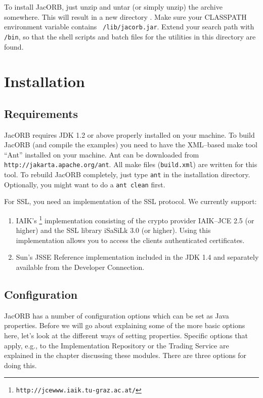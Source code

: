 \documentclass[12pt]{scrbook}
\begin{document}
To install JacORB, just unzip  and untar (or simply unzip) the archive
somewhere.  This will result  in a new directory {\tt \JacORBDir}.
Make   sure  your   CLASSPATH  environment   variable   contains  {\tt
\JacORBDir/lib/jacorb.jar}. Extend  your search path  with
{\tt  \JacORBDir/bin}, so  that the shell scripts and batch files  for
the utilities in this directory are found.

\section{Installation}
\label{Sec_installation}

\subsection{Requirements}

JacORB requires JDK 1.2 or above properly installed on your machine.
To build JacORB (and compile the examples) you need to have the
XML--based make tool ``Ant'' installed on your machine.  Ant can be
downloaded from {\tt http://jakarta.apache.org/ant}. All make files
({\tt build.xml}) are written for this tool. To rebuild JacORB
completely, just type {\tt ant} in the installation directory.
Optionally, you might want to do a {\tt ant clean} first.

For SSL, you need an implementation of the SSL protocol. We currently support:

\begin{enumerate}
\item IAIK's \footnote{{\tt http://jcewww.iaik.tu-graz.ac.at/}} implementation
  consisting of the crypto provider IAIK--JCE 2.5 (or higher) and the SSL
  library iSaSiLk 3.0 (or higher). Using this implementation allows you to
  access the clients authenticated certificates.
\item Sun's JSSE Reference implementation included in the JDK 1.4 and
  separately available from the Developer Connection.
\end{enumerate}

\subsection{Configuration}
\label{configuration}

JacORB has a number of configuration  options which can be set as Java
properties.  Before we will go about explaining some of the more basic
options   here,  let's  look   at  the   different  ways   of  setting
properties. Specific  options that apply, e.g.,  to the Implementation
Repository  or  the  Trading  Service  are explained  in  the  chapter
discussing these modules. There are three options for doing this.
\end{document}
